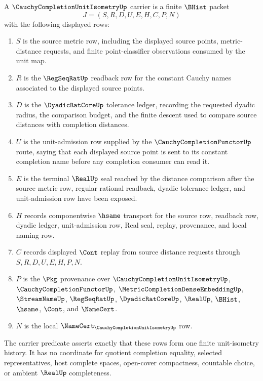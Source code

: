 \begin{definition}
\label{def:cauchy-completion-unit-isometry-carrier}
A $\CauchyCompletionUnitIsometryUp$ carrier is a finite $\BHist$ packet
$$
J=(S,R,D,U,E,H,C,P,N)
$$
with the following displayed rows:
\begin{enumerate}
\item $S$ is the source metric row, including the displayed source points,
metric-distance requests, and finite point-classifier observations consumed by
the unit map.
\item $R$ is the $\RegSeqRatUp$ readback row for the constant Cauchy names
associated to the displayed source points.
\item $D$ is the $\DyadicRatCoreUp$ tolerance ledger, recording the requested
dyadic radius, the comparison budget, and the finite descent used to compare
source distances with completion distances.
\item $U$ is the unit-admission row supplied by the
$\CauchyCompletionFunctorUp$ route, saying that each displayed source point is
sent to its constant completion name before any completion consumer can read
it.
\item $E$ is the terminal $\RealUp$ seal reached by the distance comparison
after the source metric row, regular rational readback, dyadic tolerance
ledger, and unit-admission row have been exposed.
\item $H$ records componentwise $\hsame$ transport for the source row,
readback row, dyadic ledger, unit-admission row, Real seal, replay,
provenance, and local naming row.
\item $C$ records displayed $\Cont$ replay from source distance requests
through $S,R,D,U,E,H,P,N$.
\item $P$ is the $\Pkg$ provenance over $\CauchyCompletionUnitIsometryUp$,
$\CauchyCompletionFunctorUp$,
$\MetricCompletionDenseEmbeddingUp$, $\StreamNameUp$, $\RegSeqRatUp$,
$\DyadicRatCoreUp$, $\RealUp$, $\BHist$, $\hsame$, $\Cont$, and $\NameCert$.
\item $N$ is the local $\NameCert_{\CauchyCompletionUnitIsometryUp}$ row.
\end{enumerate}
The carrier predicate asserts exactly that these rows form one finite
unit-isometry history. It has no coordinate for quotient completion equality,
selected representatives, host complete spaces, open-cover compactness,
countable choice, or ambient $\RealUp$ completeness.
\end{definition}

